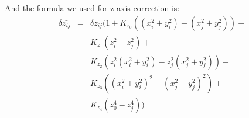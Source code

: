 And the formula we used for z axis correction is:
\begin{eqnarray}
  \delta{\bar{z_{ij}}} & = & \delta{z_{ij}}(1 + K_{z_0}((x_i^2 + y_i^2) - (x_j^2 + y_j^2)) + \nonumber\\
  & & K_{z_1}(z_i^2 - z_j^2) + \nonumber\\
  & & K_{z_2}(z_i^2(x_i^2 + y_i^2)- z_j^2(x_j^2 + y_j^2)) + \nonumber\\
  & & K_{z_3}((x_i^2 + y_i^2)^2 - (x_j^2 + y_j^2)^2) + \nonumber\\
  & & K_{z_4}(z_0^4 - z_j^4))  
\end{eqnarray}



